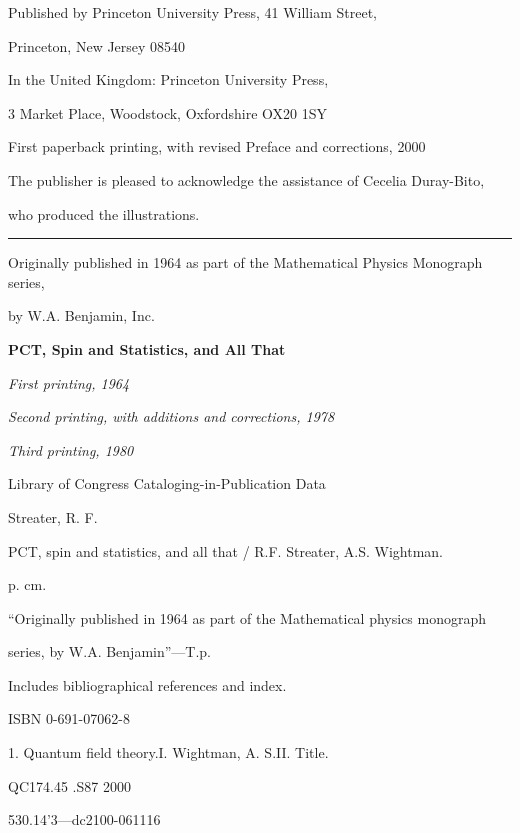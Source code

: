 \begin{titlepage}
\thispagestyle{empty}
\small
\raggedright

Published by Princeton University Press, 41 William Street,\par
Princeton, New Jersey 08540\par
In the United Kingdom: Princeton University Press,\par
3 Market Place, Woodstock, Oxfordshire OX20 1SY

First paperback printing, with revised Preface and corrections, 2000

The publisher is pleased to acknowledge the assistance of Cecelia Duray-Bito,\par
who produced the illustrations.

\vspace{1.5em}
\noindent\rule{\textwidth}{0.4pt}
\vspace{1.5em}

Originally published in 1964 as part of the Mathematical Physics Monograph series,\par
by W.A. Benjamin, Inc.

\textbf{PCT, Spin and Statistics, and All That}\par
\emph{First printing, 1964}\par
\emph{Second printing, with additions and corrections, 1978}\par
\emph{Third printing, 1980}

Library of Congress Cataloging-in-Publication Data

Streater, R. F.\par
\hspace*{2em}PCT, spin and statistics, and all that / R.F. Streater, A.S. Wightman.\par
\hspace*{2em}p. cm.\par
\hspace*{2em}``Originally published in 1964 as part of the Mathematical physics monograph\par
series, by W.A. Benjamin''---T.p.\par
\hspace*{2em}Includes bibliographical references and index.\par
\hspace*{2em}ISBN 0-691-07062-8\par
\hspace*{2em}1. Quantum field theory.\quad I. Wightman, A. S.\quad II. Title.\par
\hspace*{2em}QC174.45 .S87 2000\par
\hspace*{2em}530.14'3---dc21\hfill 00-061116


\end{titlepage}

